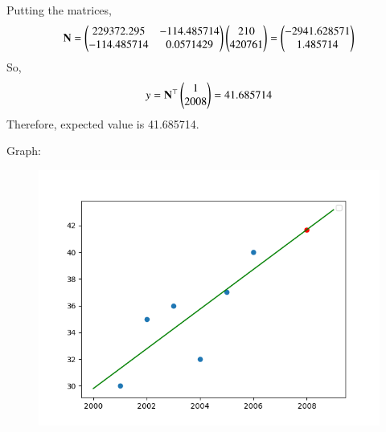 \documentclass[journal,12pt,onecolumn]{IEEEtran}
\begin{document}
		Putting the matrices,\begin{align}
				\mathbf{N}	= \begin{pmatrix}229372.295 & -114.485714 \\
-114.485714 & 0.0571429\end{pmatrix}\begin{pmatrix}210 \\ 420761\end{pmatrix} = \begin{pmatrix}-2941.628571 \\
1.485714\end{pmatrix}
		\end{align}
		So,
		\begin{align}
				y = \mathbf{N}^\top\begin{pmatrix}1\\2008\end{pmatrix} = 41.685714
		\end{align}
		Therefore, expected value is 41.685714.
	

	Graph:
\begin{figure}[h!]
	\centering
	\includegraphics[width=0.7\linewidth]{img.png}
\end{figure}
\end{document}
